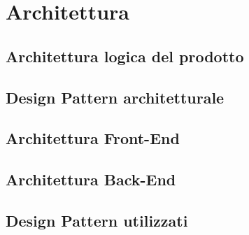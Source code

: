 \chapter{Architettura} \label{cap:architettura}

\section{Architettura logica del prodotto}

\section{Design Pattern architetturale}

\section{Architettura Front-End}

\section{Architettura Back-End}

\section{Design Pattern utilizzati}